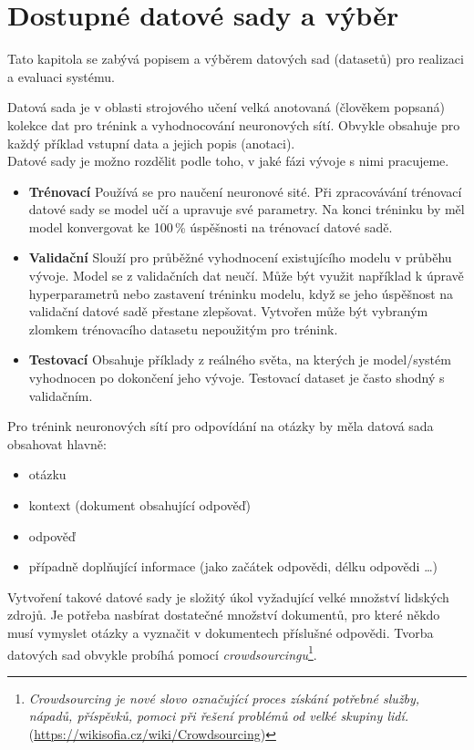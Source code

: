 \chapter{Dostupné datové sady a výběr}
\label{available_datasets}
Tato kapitola se zabývá popisem a výběrem datových sad (datasetů) pro realizaci a evaluaci systému.\par
Datová sada je v oblasti strojového učení velká anotovaná (člověkem popsaná) kolekce dat pro trénink a vyhodnocování neuronových sítí. Obvykle obsahuje pro každý příklad vstupní data a jejich popis (anotaci).\\
Datové sady je možno rozdělit podle toho, v jaké fázi vývoje s nimi pracujeme.
\begin{itemize}
    \item \textbf{Trénovací} Používá se pro naučení neuronové sité. Při zpracovávání trénovací datové sady se model učí a upravuje své parametry. Na konci tréninku by měl model konvergovat ke 100\,\% úspěšnosti na trénovací datové sadě.
    \item \textbf{Validační} Slouží pro průběžné vyhodnocení existujícího modelu v průběhu vývoje. Model se z validačních dat neučí. Může být využit například k úpravě hyperparametrů nebo zastavení tréninku modelu, když se jeho úspěšnost na validační datové sadě přestane zlepšovat. Vytvořen může být vybraným zlomkem trénovacího datasetu nepoužitým pro trénink.
    \item \textbf{Testovací} Obsahuje příklady z reálného světa, na kterých je model/systém vyhodnocen po dokončení jeho vývoje. Testovací dataset je často shodný s validačním.
\end{itemize}
Pro trénink neuronových sítí pro odpovídání na otázky by měla datová sada obsahovat hlavně:
\begin{itemize}
    \item otázku
    \item kontext (dokument obsahující odpověď)
    \item odpověď
    \item případně doplňující informace (jako začátek odpovědi, délku odpovědi \dots)
\end{itemize}
Vytvoření takové datové sady je složitý úkol vyžadující velké množství lidských zdrojů. Je potřeba nasbírat dostatečné množství dokumentů, pro které někdo musí vymyslet otázky a vyznačit v dokumentech příslušné odpovědi. Tvorba datových sad obvykle probíhá pomocí \emph{crowdsourcingu}\footnote{\emph{Crowdsourcing je nové slovo označující proces získání potřebné služby, nápadů, příspěvků, pomoci při řešení problémů od velké skupiny lidí.} (\url{https://wikisofia.cz/wiki/Crowdsourcing})}.

